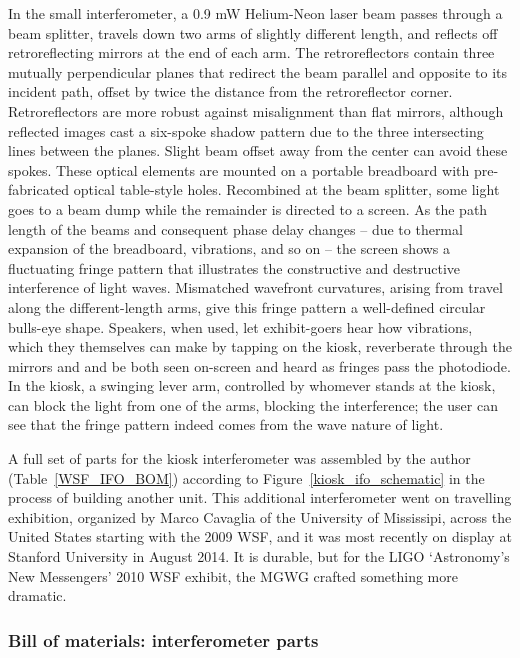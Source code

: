 In the small interferometer, a 0.9 mW Helium-Neon laser beam passes through a beam splitter, travels down two arms of slightly different length, and reflects off retroreflecting mirrors at the end of each arm.
The retroreflectors contain three mutually perpendicular planes that redirect the beam parallel and opposite to its incident path, offset by twice the distance from the retroreflector corner.
Retroreflectors are more robust against misalignment than flat mirrors, although reflected images cast a six-spoke shadow pattern due to the three intersecting lines between the planes.
Slight beam offset away from the center can avoid these spokes.
These optical elements are mounted on a portable breadboard with pre-fabricated optical table-style holes.
Recombined at the beam splitter, some light goes to a beam dump while the remainder is directed to a screen.
As the path length of the beams and consequent phase delay changes -- due to thermal expansion of the breadboard, vibrations, and so on -- the screen shows a fluctuating fringe pattern that illustrates the constructive and destructive interference of light waves.
Mismatched wavefront curvatures, arising from travel along the different-length arms, give this fringe pattern a well-defined circular bulls-eye shape.
Speakers, when used, let exhibit-goers hear how vibrations, which they themselves can make by tapping on the kiosk, reverberate through the mirrors and and be both seen on-screen and heard as fringes pass the photodiode. 
In the kiosk, a swinging lever arm, controlled by whomever stands at the kiosk, can block the light from one of the arms, blocking the interference; the user can see that the fringe pattern indeed comes from the wave nature of light.

A full set of parts for the kiosk interferometer was assembled by the author (Table~\ref{WSF_IFO_BOM}) according to Figure~\ref{kiosk_ifo_schematic} in the process of building another unit.
This additional interferometer went on travelling exhibition, organized by Marco Cavaglia of the University of Mississipi, across the United States starting with the 2009 WSF, and it was most recently on display at Stanford University in August 2014.
It is durable, but for the LIGO `Astronomy's New Messengers' 2010 WSF exhibit, the MGWG crafted something more dramatic.

    \subsubsection{Bill of materials: interferometer parts}

